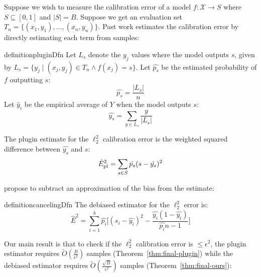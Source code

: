 Suppose we wish to measure the calibration error of a model $f : \mathcal{X} \to S$ where $S \subseteq [0, 1]$ and $|S| = B$. Suppose we get an evaluation set $T_n = \{(x_1, y_1), \dots, (x_n, y_n)\}$. Past work estimates the calibration error by directly estimating each term from samples:

\begin{restatable}{definition}{pluginDfn}
\label{dfn:plugin-estimator}
  Let $L_s$ denote the $y_j$ values where the model outputs $s$, given by $L_s = \{ y_j \; | \; (x_j, y_j) \in T_n\wedge f(x_j) = s \}$. Let $\hat{p_s}$ be the estimated probability of $f$ outputting $s$:
\[ \hat{p_s} = \frac{|L_s|}{n} \]
Let $\hat y_i$ be the empirical average of $Y$ when the model outputs $s$:
\[ \hat{y_s} = \sum_{y \in L_s} \frac{y}{|L_s|} \] 

  The plugin estimate for the $\ell_2^2$ calibration error is the weighted squared difference between $\hat{y_s}$ and $s$:
\[ \hat{E}_{\textup{pl}}^2{} = \sum_{s \in S} \hat{p_s} (s - \hat{y_s})^2 \]
\end{restatable}

\cite{brocker2012empirical, ferro2012bias} propose to subtract an approximation of the bias from the estimate:

\begin{restatable}{definition}{cancelingDfn}
  The debiased  estimator for the $\ell_2^2$ error is:
\[ \hat{E}^2 = \sum_{i=1}^b \hat{p_i} \Big[ (s_i - \hat{y_i})^2 - \frac{\hat{y_i}(1 - \hat{y_i})}{\hat{p_i}n-1} \Big] \]
\end{restatable}

Our main result is that to check if the $\ell_2^2$ calibration error is $\leq \epsilon^2$, the plugin estimator requires $\widetilde{O}(\frac{B}{\epsilon^2})$ samples (Theorem~\ref{thm:final-plugin}) while the debiased estimator requires $\widetilde{O}(\frac{\sqrt{B}}{\epsilon^2})$ samples (Theorem~\ref{thm:final-ours}):

